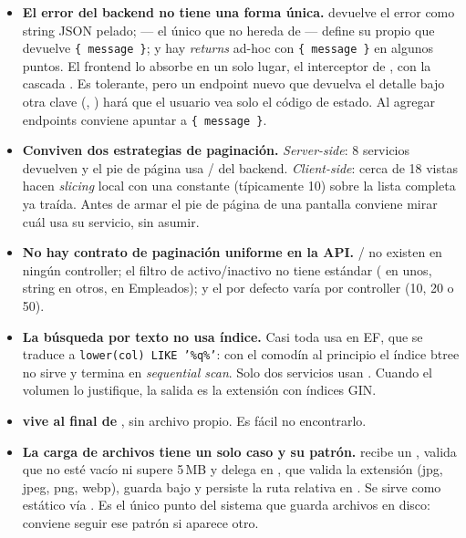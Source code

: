 \begin{itemize}
  \item \textbf{El error del backend no tiene una forma única.} \allowbreak {} devuelve el error como string JSON pelado; \allowbreak {} --- el único que no hereda de  --- define su propio  que devuelve \texttt{\{ message \}}; y hay \emph{returns} ad-hoc con \texttt{\{ message \}} en algunos puntos. El frontend lo absorbe en un solo lugar, el interceptor de , con la cascada . Es tolerante, pero un endpoint nuevo que devuelva el detalle bajo otra clave (, ) hará que el usuario vea solo el código de estado. Al agregar endpoints conviene apuntar a \texttt{\{ message \}}.
  \item \textbf{Conviven dos estrategias de paginación.} \emph{Server-side}: 8 servicios devuelven  y el pie de página usa / del backend. \emph{Client-side}: cerca de 18 vistas hacen \emph{slicing} local con una constante  (típicamente 10) sobre la lista completa ya traída. Antes de armar el pie de página de una pantalla conviene mirar cuál usa su servicio, sin asumir.
  \item \textbf{No hay contrato de paginación uniforme en la API.} / no existen en ningún controller; el filtro de activo/inactivo no tiene estándar ( en unos,  string en otros,  en Empleados); y el  por defecto varía por controller (10, 20 o 50).
  \item \textbf{La búsqueda por texto no usa índice.} Casi toda usa \allowbreak {}\allowbreak {} en EF, que se traduce a \texttt{lower(col) LIKE '\%q\%'}: con el comodín al principio el índice btree no sirve y termina en \emph{sequential scan}. Solo dos servicios usan \allowbreak {}\allowbreak {}. Cuando el volumen lo justifique, la salida es la extensión  con índices GIN.
  \item \textbf{ vive al final de }, sin archivo propio. Es fácil no encontrarlo.
  \item \textbf{La carga de archivos tiene un solo caso y su patrón.} \allowbreak {} recibe un , valida que no esté vacío ni supere 5\,MB y delega en \allowbreak {}, que valida la extensión (jpg, jpeg, png, webp), guarda bajo \allowbreak {}\allowbreak {} y persiste la ruta relativa en \allowbreak {}. Se sirve como estático vía \allowbreak {}. Es el único punto del sistema que guarda archivos en disco: conviene seguir ese patrón si aparece otro.

\end{itemize}
